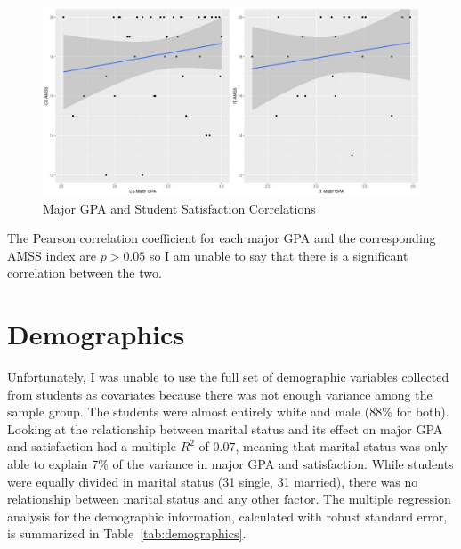 \begin{figure}[!hbtp]
  \centering
  \includegraphics[width=1.05\textwidth]{figures/chapter4/major_gpa_amss_plots.jpg}
  \caption{Major GPA and Student Satisfaction Correlations}
  \label{fig:major_gpa_amss_plots}
\end{figure}

The Pearson correlation coefficient for each major GPA and the corresponding AMSS index are $p>0.05$ so I am unable to say that there is a significant correlation between the two.

\section{Demographics}
Unfortunately, I was unable to use the full set of demographic variables collected from students as covariates because there was not enough variance among the sample group. The students were almost entirely white and male (88\% for both). Looking at the relationship between marital status and its effect on major GPA and satisfaction had a multiple $R^2$ of $0.07$, meaning that marital status was only able to explain 7\% of the variance in major GPA and satisfaction. While students were equally divided in marital status (31 single, 31 married), there was no relationship between marital status and any other factor. The multiple regression analysis for the demographic information, calculated with robust standard error, is summarized in Table~\ref{tab:demographics}.

